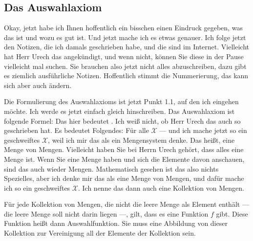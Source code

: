\subsection{Das Auswahlaxiom}

\begin{spoken-clean}[00:10:15 - 00:12:30]
Okay, jetzt habe ich Ihnen hoffentlich ein bisschen einen Eindruck gegeben, was das ist und wozu es gut ist. Und jetzt mache ich es etwas genauer. Ich folge jetzt den Notizen, die ich damals geschrieben habe, und die sind im Internet. Vielleicht hat Herr Urech das angekündigt, und wenn nicht, können Sie diese in der Pause vielleicht mal suchen. Sie brauchen also jetzt nicht alles abzuschreiben, dazu gibt es ziemlich ausführliche Notizen. Hoffentlich stimmt die Nummerierung, das kann sich aber auch ändern.

Die Formulierung des Auswahlaxioms ist jetzt Punkt 1.1, auf den ich eingehen möchte. Ich werde es jetzt einfach gleich hinschreiben. Das Auswahlaxiom ist folgende Formel: Das hier bedeutet . Ich weiß nicht, ob Herr Urech das auch so geschrieben hat. Es bedeutet Folgendes: Für alle $\mathcal{X}$ --- und ich mache jetzt so ein geschweiftes $\mathcal{X}$, weil ich mir das als ein Mengensystem denke. Das heißt, eine Menge von Mengen. Vielleicht haben Sie bei Herrn Urech gehört, dass alles eine Menge ist. Wenn Sie eine Menge haben und sich die Elemente davon anschauen, sind das auch wieder Mengen. Mathematisch gesehen ist das also nichts Spezielles, aber ich denke mir das als eine Menge von Mengen, und dafür mache ich so ein geschweiftes $\mathcal{X}$. Ich nenne das dann auch eine Kollektion von Mengen. 

Für jede Kollektion von Mengen, die nicht die leere Menge als Element enthält --- die leere Menge soll nicht darin liegen ---, gilt, dass es eine Funktion $f$ gibt. Diese Funktion heißt dann Auswahlfunktion. Sie muss eine Abbildung von dieser Kollektion zur Vereinigung all der Elemente der Kollektion sein.
\end{spoken-clean}

